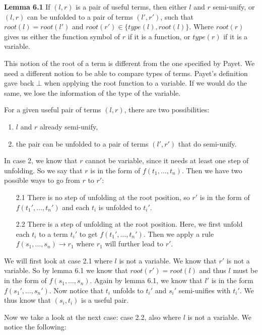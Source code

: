 \textbf{Lemma 6.1} If $(l, r)$ is a pair of useful terms, then either $l$ and $r$ semi-unify, or $(l, r)$ can be unfolded to a pair of terms $(l', r')$, such that $\textit{root}(l) = \textit{root}(l')$ and $\textit{root}(r') \in \{ \textit{type}(l), \textit{root}(l) \}$. Where $\textit{root}(r)$ gives us either the function symbol of $r$ if it is a function, or $\textit{type}(r)$ if it is a variable. 

This notion of the root of a term is different from the one specified by Payet. We need a different notion to be able to compare types of terms. Payet's definition gave back $\bot$ when applying the root function to a variable. If we would do the same, we lose the information of the type of the variable.

For a given useful pair of terms $(l, r)$, there are two possibilities: 
\begin{enumerate}
    \itemsep 0em
    \item $l$ and $r$ already semi-unify,
    \item the pair can be unfolded to a pair of terms $(l', r')$ that do semi-unify.
\end{enumerate} 
In case 2, we know that $r$ cannot be variable, since it needs at least one step of unfolding. So we say that $r$ is in the form of $f(t_1, \dots, t_n)$. Then we have two possible ways to go from $r$ to $r'$: 
\begin{enumerate}
    \itemsep 0em
    \item[2.1] There is no step of unfolding at the root position, so $r'$ is in the form of $f(t_1', \dots, t_n')$ and each $t_i$ is unfolded to $t_i'$. 
    \item[2.2] There is a step of unfolding at the root position. Here, we first unfold each $t_i$ to a term $t_i'$ to get $f(t_1', \dots, t_n')$. Then we apply a rule $f(s_1, \dots, s_n) \rightarrow r_1$ where $r_1$ will further lead to $r'$. 
\end{enumerate}
We will first look at case 2.1 where $l$ is not a variable. We know that $r'$ is not a variable. So by lemma 6.1 we know that $\textit{root}(r') = \textit{root}(l)$ and thus $l$ must be in the form of $f(s_1, \dots, s_n)$. Again by lemma 6.1, we know that $l'$ is in the form $f(s_1', \dots, s_n')$. Now notice that $t_i$ unfolds to $t_i'$ and $s_i'$ semi-unifies with $t_i'$. We thus know that $(s_i, t_i)$ is a useful pair. 

Now we take a look at the next case: case 2.2, also where $l$ is not a variable. We notice the following: 

